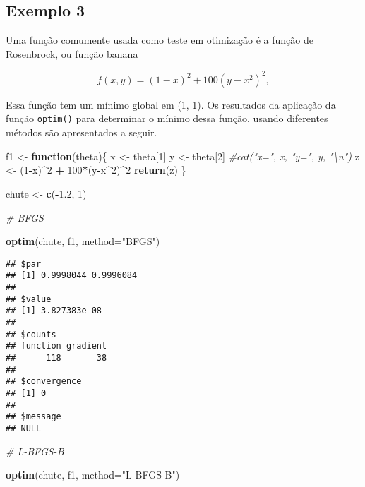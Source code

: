 \documentclass[
]{article}
\newenvironment{Shaded}{\begin{snugshade}}{\end{snugshade}}
\newcommand{\AttributeTok}[1]{\textcolor[rgb]{0.13,0.29,0.53}{#1}}
\newcommand{\CommentTok}[1]{\textcolor[rgb]{0.56,0.35,0.01}{\textit{#1}}}
\newcommand{\ControlFlowTok}[1]{\textcolor[rgb]{0.13,0.29,0.53}{\textbf{#1}}}
\newcommand{\DecValTok}[1]{\textcolor[rgb]{0.00,0.00,0.81}{#1}}
\newcommand{\FloatTok}[1]{\textcolor[rgb]{0.00,0.00,0.81}{#1}}
\newcommand{\FunctionTok}[1]{\textcolor[rgb]{0.13,0.29,0.53}{\textbf{#1}}}
\newcommand{\NormalTok}[1]{#1}
\newcommand{\OtherTok}[1]{\textcolor[rgb]{0.56,0.35,0.01}{#1}}
\newcommand{\SpecialCharTok}[1]{\textcolor[rgb]{0.81,0.36,0.00}{\textbf{#1}}}
\newcommand{\StringTok}[1]{\textcolor[rgb]{0.31,0.60,0.02}{#1}}
\begin{document}
\hypertarget{exemplo-3}{%
\subsection{Exemplo 3}\label{exemplo-3}}

Uma função comumente usada como teste em otimização é a função de
Rosenbrock, ou função banana

\[f(x,y)=(1-x)^2+100(y-x^2)^2,\]

Essa função tem um mínimo global em (1, 1). Os resultados da aplicação
da função \texttt{optim()} para determinar o mínimo dessa função, usando
diferentes métodos são apresentados a seguir.

\begin{Shaded}
\begin{Highlighting}[]
\NormalTok{f1 }\OtherTok{\textless{}{-}} \ControlFlowTok{function}\NormalTok{(theta)\{ }
\NormalTok{x }\OtherTok{\textless{}{-}}\NormalTok{ theta[}\DecValTok{1}\NormalTok{]}
\NormalTok{y }\OtherTok{\textless{}{-}}\NormalTok{ theta[}\DecValTok{2}\NormalTok{]}
\CommentTok{\#cat("x=", x, "y=", y, "\textbackslash{}n")}
\NormalTok{z }\OtherTok{\textless{}{-}}\NormalTok{ (}\DecValTok{1}\SpecialCharTok{{-}}\NormalTok{x)}\SpecialCharTok{\^{}}\DecValTok{2} \SpecialCharTok{+} \DecValTok{100}\SpecialCharTok{*}\NormalTok{(y}\SpecialCharTok{{-}}\NormalTok{x}\SpecialCharTok{\^{}}\DecValTok{2}\NormalTok{)}\SpecialCharTok{\^{}}\DecValTok{2}
\FunctionTok{return}\NormalTok{(z)}
\NormalTok{\}}

\NormalTok{chute }\OtherTok{\textless{}{-}} \FunctionTok{c}\NormalTok{(}\SpecialCharTok{{-}}\FloatTok{1.2}\NormalTok{, }\DecValTok{1}\NormalTok{)}

\CommentTok{\# BFGS}

\FunctionTok{optim}\NormalTok{(chute, f1, }\AttributeTok{method=}\StringTok{"BFGS"}\NormalTok{)}
\end{Highlighting}
\end{Shaded}

\begin{verbatim}
## $par
## [1] 0.9998044 0.9996084
## 
## $value
## [1] 3.827383e-08
## 
## $counts
## function gradient 
##      118       38 
## 
## $convergence
## [1] 0
## 
## $message
## NULL
\end{verbatim}

\begin{Shaded}
\begin{Highlighting}[]
\CommentTok{\# L{-}BFGS{-}B}

\FunctionTok{optim}\NormalTok{(chute, f1, }\AttributeTok{method=}\StringTok{"L{-}BFGS{-}B"}\NormalTok{)}
\end{Highlighting}
\end{Shaded}
\end{document}
